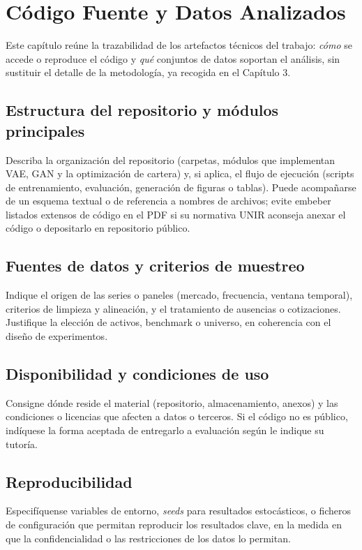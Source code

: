 \chapter{Código Fuente y Datos Analizados}

Este capítulo reúne la trazabilidad de los artefactos técnicos del trabajo: \emph{cómo} se accede o reproduce el código y \emph{qué} conjuntos de datos soportan el análisis, sin sustituir el detalle de la metodología, ya recogida en el Capítulo 3.

\section{Estructura del repositorio y módulos principales}
Describa la organización del repositorio (carpetas, módulos que implementan VAE, GAN y la optimización de cartera) y, si aplica, el flujo de ejecución (scripts de entrenamiento, evaluación, generación de figuras o tablas). Puede acompañarse de un esquema textual o de referencia a nombres de archivos; evite embeber listados extensos de código en el PDF si su normativa UNIR aconseja anexar el código o depositarlo en repositorio público.

\section{Fuentes de datos y criterios de muestreo}
Indique el origen de las series o paneles (mercado, frecuencia, ventana temporal), criterios de limpieza y alineación, y el tratamiento de ausencias o cotizaciones. Justifique la elección de activos, benchmark o universo, en coherencia con el diseño de experimentos.

\section{Disponibilidad y condiciones de uso}
Consigne dónde reside el material (repositorio, almacenamiento, anexos) y las condiciones o licencias que afecten a datos o terceros. Si el código no es público, indíquese la forma aceptada de entregarlo a evaluación según le indique su tutoría.

\section{Reproducibilidad}
Especifíquense variables de entorno, \textit{seeds} para resultados estocásticos, o ficheros de configuración que permitan reproducir los resultados clave, en la medida en que la confidencialidad o las restricciones de los datos lo permitan.
